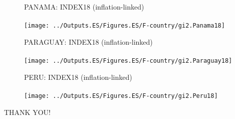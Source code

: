 \documentclass{beamer}
\begin{document}
%
\begin{frame}
	
	\begin{figure}
		\centering
		PANAMA: INDEX18 (inflation-linked)\\~\\
		\texttt{[image: ../Outputs.ES/Figures.ES/F-country/gi2.Panama18]}
	\end{figure}
\end{frame}
%
\begin{frame}
	
	\begin{figure}
		\centering
		PARAGUAY: INDEX18 (inflation-linked)\\~\\
		\texttt{[image: ../Outputs.ES/Figures.ES/F-country/gi2.Paraguay18]}
	\end{figure}
\end{frame}
%
\begin{frame}
	
	\begin{figure}
		\centering
		PERU: INDEX18 (inflation-linked)\\~\\
		\texttt{[image: ../Outputs.ES/Figures.ES/F-country/gi2.Peru18]}
	\end{figure}
\end{frame}
%
	
%

\begin{frame}
	
	THANK YOU!
	
\end{frame}
\end{document}
